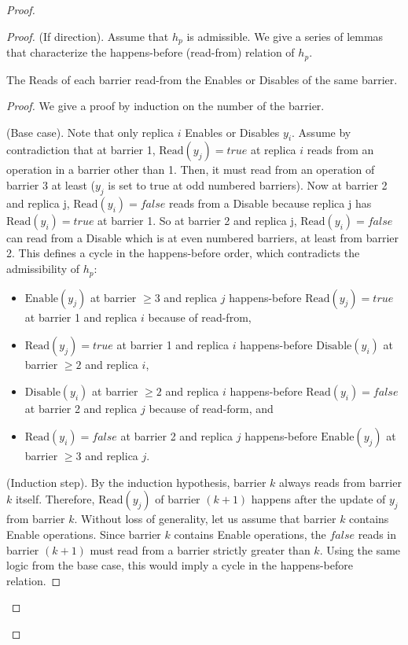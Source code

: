 \begin{proof}
\begin{proof}
    (If direction). Assume that $h_p$ is admissible. We give a series of lemmas that characterize the happens-before (read-from) relation of $h_p$.

  \begin{lemma}
    \label{crdt:flag:npc-proof:lemma1}
    The \textrm{Read}s of each barrier read-from the \textrm{Enable}s or \textrm{Disable}s of the same barrier. 
  \end{lemma}

  \begin{proof}
    We give a proof by induction on the number of the barrier.
    
    \noindent
    (Base case). Note that only replica $i$ \textrm{Enable}s or \textrm{Disable}s $y_i$. Assume by contradiction that at barrier 1, $\mathrm{Read}(y_j) = true$ at replica $i$ reads from an operation in a barrier other than 1. Then, it must read from an operation of barrier 3 at least ($y_j$ is set to true at odd numbered barriers). Now at barrier 2 and replica j, $\mathrm{Read}(y_i) = false$ reads from a \textrm{Disable} because replica j has $\mathrm{Read}(y_i) = true$ at barrier 1. So at barrier 2 and replica j, $\mathrm{Read}(y_i) = false$ can read from a \textrm{Disable} which is at even numbered barriers, at least from barrier 2. This defines a cycle in the happens-before order, which contradicts the admissibility of $h_p$: 
    \begin{itemize}
    	\item $\mathrm{Enable}(y_j)$ at barrier $\geq3$ and replica $j$ happens-before $\mathrm{Read}(y_j) = true$ at barrier 1 and replica $i$ because of read-from, 
	\item $\mathrm{Read}(y_j) = true$ at barrier 1 and replica $i$ happens-before $\mathrm{Disable}(y_i)$ at barrier $\geq2$ and replica $i$,
	\item $\mathrm{Disable}(y_i)$ at barrier $\geq2$ and replica $i$ happens-before $\mathrm{Read}(y_i) = false$ at barrier 2 and replica $j$ because of read-form, and 
	\item $\mathrm{Read}(y_i) = false$ at barrier 2 and replica $j$ happens-before $\mathrm{Enable}(y_j)$ at barrier $\geq3$ and replica $j$.
   \end{itemize}
    
    \noindent
    (Induction step). By the induction hypothesis, barrier $k$ always reads from barrier $k$ itself. Therefore, $\mathrm{Read}(y_j)$ of barrier $(k+1)$ happens after the update of $y_j$ from barrier $k$. Without loss of generality, let us assume that barrier $k$ contains \textrm{Enable} operations. Since barrier $k$ contains  \textrm{Enable} operations, the $false$ reads in barrier $(k+1)$ must read from a barrier strictly greater than $k$. Using the same logic from the base case, this would imply a cycle in the happens-before relation. 
  \end{proof}


\end{proof}
\end{proof}
